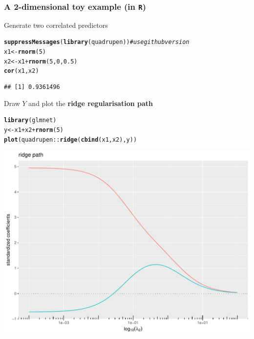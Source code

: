 \documentclass{beamer}\usepackage[]{graphicx}\usepackage[]{color}
\makeatletter
\newcommand{\hlnum}[1]{\textcolor[rgb]{0.686,0.059,0.569}{#1}}%
\newcommand{\hlcom}[1]{\textcolor[rgb]{0.678,0.584,0.686}{\textit{#1}}}%
\newcommand{\hlopt}[1]{\textcolor[rgb]{0,0,0}{#1}}%
\newcommand{\hlstd}[1]{\textcolor[rgb]{0.345,0.345,0.345}{#1}}%
\newcommand{\hlkwb}[1]{\textcolor[rgb]{0.69,0.353,0.396}{#1}}%
\newcommand{\hlkwd}[1]{\textcolor[rgb]{0.737,0.353,0.396}{\textbf{#1}}}%
\newenvironment{kframe}{%
 \def\at@end@of@kframe{}%
 \ifinner\ifhmode%
  \def\at@end@of@kframe{\end{minipage}}%
  \begin{minipage}{\columnwidth}%
 \fi\fi%
 \def\FrameCommand##1{\hskip\@totalleftmargin \hskip-\fboxsep
 \colorbox{shadecolor}{##1}\hskip-\fboxsep
     \hskip-\linewidth \hskip-\@totalleftmargin \hskip\columnwidth}%
 \MakeFramed {\advance\hsize-\width
   \@totalleftmargin\z@ \linewidth\hsize
   \@setminipage}}%
 {\par\unskip\endMakeFramed%
 \at@end@of@kframe}
\newenvironment{knitrout}{}{} %
\makeatother
\begin{document}
\begin{frame}
  \frametitle{A 2-dimensional toy example (in \texttt{R})}

Generate two correlated predictors
\begin{knitrout}\scriptsize
{}\color{fgcolor}\begin{kframe}
\begin{alltt}
\hlkwd{suppressMessages}\hlstd{(}\hlkwd{library}\hlstd{(quadrupen))} \hlcom{# use github version}
\hlstd{x1} \hlkwb{<-} \hlkwd{rnorm}\hlstd{(}\hlnum{5}\hlstd{)}
\hlstd{x2} \hlkwb{<-} \hlstd{x1} \hlopt{+} \hlkwd{rnorm}\hlstd{(}\hlnum{5}\hlstd{,}\hlnum{0}\hlstd{,} \hlnum{0.5}\hlstd{)}
\hlkwd{cor}\hlstd{(x1,x2)}
\end{alltt}
\begin{verbatim}
## [1] 0.9361496
\end{verbatim}
\end{kframe}
\end{knitrout}

Draw $Y$ and plot the  \alert{\bf ridge regularisation path}
\begin{knitrout}\scriptsize
{}\color{fgcolor}\begin{kframe}
\begin{alltt}
\hlkwd{library}\hlstd{(glmnet)}
\hlstd{y} \hlkwb{<-} \hlstd{x1} \hlopt{+} \hlstd{x2} \hlopt{+}\hlkwd{rnorm}\hlstd{(}\hlnum{5}\hlstd{)}
\hlkwd{plot}\hlstd{(quadrupen}\hlopt{::}\hlkwd{ridge}\hlstd{(}\hlkwd{cbind}\hlstd{(x1,x2),y))}
\end{alltt}
\end{kframe}
\includegraphics[width=.8\textwidth]{figures/unnamed-chunk-18-1} 

\end{knitrout}

\end{frame}
\end{document}
